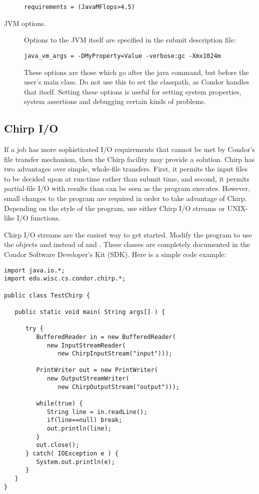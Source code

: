 \begin{description}
\begin{verbatim}
requirements = (JavaMFlops>4.5)
\end{verbatim}

\item[JVM options.]
Options to the JVM itself are specified in the 
submit description file:

\begin{verbatim}
java_vm_args = -DMyProperty=Value -verbose:gc -Xmx1024m
\end{verbatim}

These options are those which go after the java command, but before
the user's main class.  Do not use this to set the classpath, as
Condor handles that itself.  Setting these options is useful for
setting system properties, system assertions and debugging certain
kinds of problems.

\end{description}

\subsection{Chirp I/O}

If a job has more sophisticated I/O requirements that cannot
be met by Condor's file transfer mechanism,
then the Chirp facility may provide a solution.
Chirp has two advantages over simple, whole-file transfers.
First, it permits the input files to be decided upon at run-time
rather than submit time, and second,
it permits partial-file I/O with results than can be seen as the
program executes.
However, small changes to the program are required
in order to take advantage of Chirp.
Depending on the style of the program, use either Chirp I/O streams
or UNIX-like I/O functions.

Chirp I/O streams are the easiest way to get started.
Modify the program to use the objects 
and  instead of  and
.
These classes are completely documented
in the Condor Software Developer's Kit (SDK).
Here is a simple code example:

\begin{verbatim}
import java.io.*;
import edu.wisc.cs.condor.chirp.*;

public class TestChirp {

   public static void main( String args[] ) {

      try {
         BufferedReader in = new BufferedReader(
            new InputStreamReader(
               new ChirpInputStream("input")));

         PrintWriter out = new PrintWriter(
            new OutputStreamWriter(
               new ChirpOutputStream("output")));

         while(true) {
            String line = in.readLine();
            if(line==null) break;
            out.println(line);
         }
         out.close();
      } catch( IOException e ) {
         System.out.println(e);
      }
   }
}
\end{verbatim}

